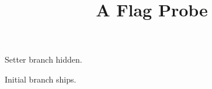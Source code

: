\documentclass{article}
\title{A Flag Probe}
\date{}
\newif\ifprobeset
\newif\ifprobeleft
\begin{document}
\maketitle
\ifprobeset Setter branch ships.\else Setter branch hidden.\fi

\ifprobeleft Initial branch hidden.\else Initial branch ships.\fi
\end{document}
